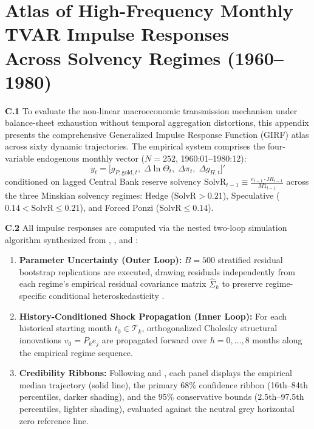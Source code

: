 \section[Monthly TVAR Impulse Response Atlas (1960--1980)]{Atlas of High-Frequency Monthly TVAR Impulse Responses\\Across Solvency Regimes (1960--1980)}
\label{app:annual_tvar}
\label{app:tvar_girf_atlas}

\textbf{C.1} To evaluate the non-linear macroeconomic transmission mechanism under balance-sheet exhaustion without temporal aggregation distortions, this appendix presents the comprehensive Generalized Impulse Response Function (GIRF) atlas across sixty dynamic trajectories. The empirical system comprises the four-variable endogenous monthly vector ($N=252$, 1960:01--1980:12):
\begin{equation}
y_t = \big[ g_{P,\text{gold},t},\; \Delta \ln \Theta_t,\; \Delta \pi_t,\; \Delta g_{H,t} \big]'
\label{eq:app_c_tvar_system}
\end{equation}
conditioned on lagged Central Bank reserve solvency $\text{SolvR}_{t-1} \equiv \frac{e_{t-1} \cdot IR_{t-1}}{M1_{t-1}}$ across the three Minskian solvency regimes: Hedge ($\text{SolvR} > 0.21$), Speculative ($0.14 < \text{SolvR} \le 0.21$), and Forced Ponzi ($\text{SolvR} \le 0.14$).

\textbf{C.2} All impulse responses are computed via the nested two-loop simulation algorithm synthesized from \citet{KoopPesaranPotter1996}, \citet{Balke2000}, and \citet{Afonso2018}:
\begin{enumerate}[leftmargin=2em]
	\item \textbf{Parameter Uncertainty (Outer Loop):} $B = 500$ stratified residual bootstrap replications are executed, drawing residuals independently from each regime's empirical residual covariance matrix $\hat{\Sigma}_k$ to preserve regime-specific conditional heteroskedasticity \citep{GoncalvesKilian2004}.
	\item \textbf{History-Conditioned Shock Propagation (Inner Loop):} For each historical starting month $t_0 \in \mathcal{T}_k$, orthogonalized Cholesky structural innovations $v_0 = P_k e_j$ are propagated forward over $h = 0, \dots, 8$ months along the empirical regime sequence.
	\item \textbf{Credibility Ribbons:} Following \citet{SimsZha1999} and \citet{RodriguezAsensio2026}, each panel displays the empirical median trajectory (solid line), the primary 68\% confidence ribbon (16th--84th percentiles, darker shading), and the 95\% conservative bounds (2.5th--97.5th percentiles, lighter shading), evaluated against the neutral grey horizontal zero reference line.
\end{enumerate}

